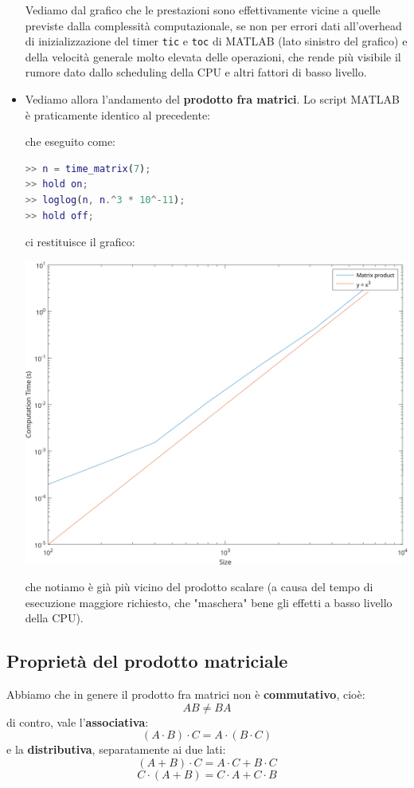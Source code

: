 \documentclass[a4paper,11pt]{article}
\begin{document}
\begin{itemize}
Vediamo dal grafico che le prestazioni sono effettivamente vicine a quelle previste dalla complessità computazionale, se non per errori dati all'overhead di inizializzazione del timer \lstinline|tic| e \lstinline|toc| di MATLAB (lato sinistro del grafico) e della velocità generale molto elevata delle operazioni, che rende più visibile il rumore dato dallo scheduling della CPU e altri fattori di basso livello.

\item Vediamo allora l'andamento del \textbf{prodotto fra matrici}. Lo script MATLAB è praticamente identico al precedente:

che eseguito come:
\begin{lstlisting}[language=MATLAB, style=codestyle]	
>> n = time_matrix(7);
>> hold on;
>> loglog(n, n.^3 * 10^-11);
>> hold off;
\end{lstlisting}
ci restituisce il grafico:
\begin{center}
	\includegraphics[scale=0.6]{../figures/matrix_perf.png}
\end{center}
che notiamo è già più vicino del prodotto scalare (a causa del tempo di esecuzione maggiore richiesto, che "maschera" bene gli effetti a basso livello della CPU). 

\end{itemize}

\subsection{Proprietà del prodotto matriciale}
Abbiamo che in genere il prodotto fra matrici non è \textbf{commutativo}, cioè:
$$
A B \neq BA
$$
di contro, vale l'\textbf{associativa}:
$$
(A \cdot B) \cdot C = A \cdot (B\cdot C)
$$
e la \textbf{distributiva}, separatamente ai due lati:
$$
(A + B) \cdot C = A \cdot C + B \cdot C
$$
$$
C \cdot (A + B) = C \cdot A + C \cdot B 
$$
\end{document}
